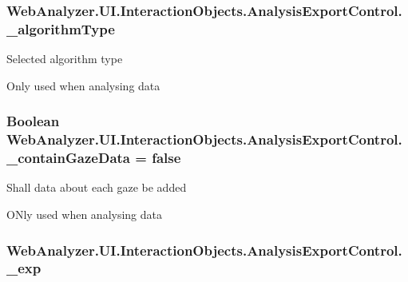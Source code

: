 \subsubsection[{\+\_\+algorithm\+Type}]{ Web\+Analyzer.\+U\+I.\+Interaction\+Objects.\+Analysis\+Export\+Control.\+\_\+algorithm\+Type\hspace{0.3cm}{\ttfamily [private]}}\label{class_web_analyzer_1_1_u_i_1_1_interaction_objects_1_1_analysis_export_control_a92c996b73e5cde9c50d25355e47fb423}


Selected algorithm type 

Only used when analysing data\hypertarget{class_web_analyzer_1_1_u_i_1_1_interaction_objects_1_1_analysis_export_control_aa58521f4baa630aee5ccf3034f74b543}{}
\subsubsection[{\+\_\+contain\+Gaze\+Data}]{\setlength{\rightskip}{0pt plus 5cm}Boolean Web\+Analyzer.\+U\+I.\+Interaction\+Objects.\+Analysis\+Export\+Control.\+\_\+contain\+Gaze\+Data = {\bf false}\hspace{0.3cm}{\ttfamily [private]}}\label{class_web_analyzer_1_1_u_i_1_1_interaction_objects_1_1_analysis_export_control_aa58521f4baa630aee5ccf3034f74b543}


Shall data about each gaze be added 

O\+Nly used when analysing data\hypertarget{class_web_analyzer_1_1_u_i_1_1_interaction_objects_1_1_analysis_export_control_a7e42e87000b58fb02e37f994efc61259}{}
\subsubsection[{\+\_\+exp}]{ Web\+Analyzer.\+U\+I.\+Interaction\+Objects.\+Analysis\+Export\+Control.\+\_\+exp\hspace{0.3cm}{\ttfamily [private]}}\label{class_web_analyzer_1_1_u_i_1_1_interaction_objects_1_1_analysis_export_control_a7e42e87000b58fb02e37f994efc61259}


